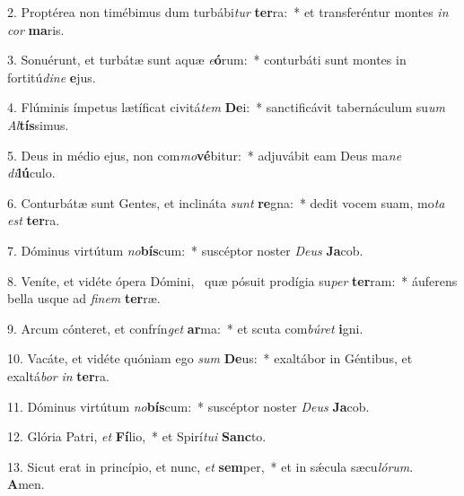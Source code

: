 2. Proptérea non timébimus dum turbábi\textit{tur} \textbf{ter}ra:~*  et transferéntur montes \textit{in} \textit{cor} \textbf{ma}ris.\

3. Sonuérunt, et turbátæ sunt aquæ \textit{e}\textbf{ó}rum:~*  conturbáti sunt montes in fortitú\textit{di}\textit{ne} \textbf{e}jus.\

4. Flúminis ímpetus lætíficat civitá\textit{tem} \textbf{De}i:~*  sanctificávit tabernáculum su\textit{um} \textit{Al}\textbf{tís}simus.\

5. Deus in médio ejus, non com\textit{mo}\textbf{vé}bitur:~*  adjuvábit eam Deus ma\textit{ne} \textit{di}\textbf{lú}culo.\

6. Conturbátæ sunt Gentes, et inclináta \textit{sunt} \textbf{re}gna:~*  dedit vocem suam, mo\textit{ta} \textit{est} \textbf{ter}ra.\

7. Dóminus virtútum \textit{no}\textbf{bís}cum:~*  suscéptor noster \textit{De}\textit{us} \textbf{Ja}cob.\

8. Veníte, et vidéte ópera Dómini, \dag\  quæ pósuit prodígia su\textit{per} \textbf{ter}ram:~*  áuferens bella usque ad \textit{fi}\textit{nem} \textbf{ter}ræ.\

9. Arcum cónteret, et confrín\textit{get} \textbf{ar}ma:~*  et scuta com\textit{bú}\textit{ret} \textbf{i}gni.\

10. Vacáte, et vidéte quóniam ego \textit{sum} \textbf{De}us:~*  exaltábor in Géntibus, et exaltá\textit{bor} \textit{in} \textbf{ter}ra.\

11. Dóminus virtútum \textit{no}\textbf{bís}cum:~*  suscéptor noster \textit{De}\textit{us} \textbf{Ja}cob.\

12. Glória Patri, \textit{et} \textbf{Fí}lio,~*  et Spirí\textit{tu}\textit{i} \textbf{Sanc}to.\

13. Sicut erat in princípio, et nunc, \textit{et} \textbf{sem}per,~*  et in sǽcula sæcu\textit{ló}\textit{rum}. \textbf{A}men.\

